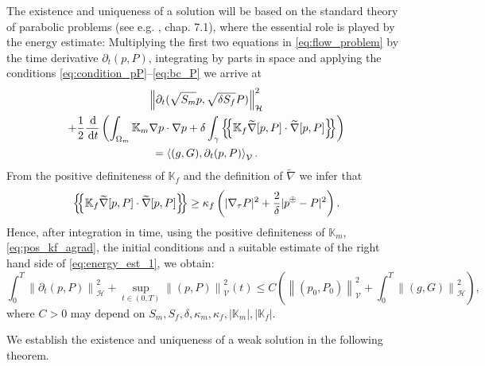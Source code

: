 \documentclass[a4paper]{article}
\def\agrad{\widetilde\nabla}
\def\avg#1{\left\{\mskip-5mu\left\{#1\right\}\mskip-5mu\right\}}
\def\d {\,{\rm d}}
\def\ddt#1{\frac{\d #1}{\d t}}
\def\dt{\prtl_t}
\def\dual#1#2{\left\langle #1,#2\right\rangle}
\def\Hf{\mathcal H}
\def\norm#1{\left\|#1\right\|}
\def\prtl{\partial}
\def\tn#1{{\mathbb{#1}}}    %
\def\Vf{{\mathcal V}} %
\newcommand{\eq}[1]{\begin{equation}#1\end{equation}}
\newcommand{\ml}[1]{\begin{multline}#1\end{multline}}
\newcommand{\opm}{ %
  {\mathbin{
    \mathchoice
      {\buildcirclepm{\displaystyle     }{0.14ex}{0.95}{0.05ex}{.7}}
      {\buildcirclepm{\textstyle        }{0.14ex}{0.95}{0.05ex}{.7}}
      {\buildcirclepm{\scriptstyle      }{0.13ex}{0.955}{0.04ex}{.55}}
      {\buildcirclepm{\scriptscriptstyle}{0.08ex}{0.95}{0.03ex}{.45}}
  }} 
}
\newcommand\buildcirclepm[5]{%
  \begin{tikzpicture}[baseline=(X.base), inner sep=-#5, outer sep=-.65]
    \node[draw,circle,line width=#4] (X)  {\footnotesize\raisebox{#2}{\scalebox{#3}{$#1\pm$}}};
  \end{tikzpicture}%
}
\begin{document}
The existence and uniqueness of a solution will be based on the standard theory of parabolic problems (see e.g. \cite{evans_pde}, chap. 7.1), where the essential role is played by the energy estimate:
Multiplying the first two equations in \eqref{eq:flow_problem} by the time derivative $\dt(p,P)$, integrating by parts in space and applying the conditions \eqref{eq:condition_pP}--\eqref{eq:bc_P} we arrive at
\ml{\label{eq:energy_est_1} \norm{\dt(\sqrt{S_m} p,\sqrt{\delta S_f} P)}_\Hf^2\\
+ \frac12\ddt{}\left(\int_{\Omega_m}\tn K_m\nabla p\cdot\nabla p
+ \delta\int_\gamma\avg{\tn K_f\agrad[p,P]\cdot\agrad[p,P]}\right)\\
= \dual{(g,G)}{\dt(p,P)}_\Vf. }
From the positive definiteness of $\tn K_f$ and the definition of $\agrad$ we infer that
\eq{ \label{eq:pos_kf_agrad} \avg{\tn K_f\agrad[p,P]\cdot\agrad[p,P]} \ge \kappa_f\left(|\nabla_\tau P|^2 + \frac2\delta|p^\opm-P|^2\right). }
Hence, after integration in time, using the positive definiteness of $\tn K_m$, \eqref{eq:pos_kf_agrad}, the initial conditions and a suitable estimate of the right hand side of \eqref{eq:energy_est_1}, we obtain:
\eq{ \label{eq:energy_est_flow} \int_0^T\norm{\dt(p,P)}_\Hf^2 + \sup_{t\in(0,T)}\norm{(p,P)}_\Vf^2(t) \le C\left(\norm{(p_0,P_0)}_\Vf^2 + \int_0^T\norm{(g,G)}_{\Hf}^2\right), }
where $C>0$ may depend on $S_m,S_f,\delta,\kappa_m,\kappa_f,|\tn K_m|,|\tn K_f|$.

We establish the existence and uniqueness of a weak solution in the following theorem.
\end{document}
